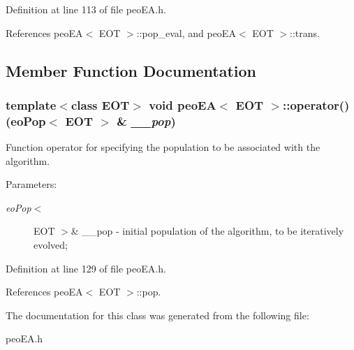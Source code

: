 Definition at line 113 of file peo\-EA.h.

References peo\-EA$<$ EOT $>$::pop\_\-eval, and peo\-EA$<$ EOT $>$::trans.

\subsection{Member Function Documentation}
\subsubsection{\setlength{\rightskip}{0pt plus 5cm}template$<$class EOT$>$ void {\bf peo\-EA}$<$ EOT $>$::operator() (eo\-Pop$<$ EOT $>$ \& {\em \_\-\_\-pop})}\label{classpeo_e_a_3c709e3b2491147d26fee36138644613}


Function operator for specifying the population to be associated with the algorithm. 

\begin{Desc}
\item[Parameters:]
\begin{description}
\item[{\em eo\-Pop$<$}]EOT $>$\& \_\-\_\-pop - initial population of the algorithm, to be iteratively evolved; \end{description}
\end{Desc}


Definition at line 129 of file peo\-EA.h.

References peo\-EA$<$ EOT $>$::pop.

The documentation for this class was generated from the following file:\begin{CompactItemize}
\item 
peo\-EA.h\end{CompactItemize}
